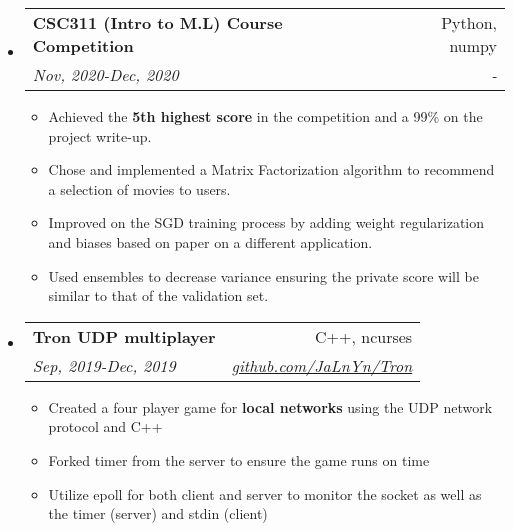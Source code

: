 \documentclass[letterpaper,12pt]{article}[leftmargin=*]
\makeatletter
\def \entryspacing {-0pt}
\newcommand{\resumeEntryStart}{\begin{itemize}[leftmargin=2.5mm]}
\newcommand{\resumeEntryEnd}{\end{itemize}\vspace{\entryspacing}}
\newcommand{\resumeItemListStart}{\begin{itemize}[leftmargin=4.5mm]}
\newcommand{\resumeItemListEnd}{\end{itemize}}
\newcommand{\resumeItem}[1]{
  \item\small{
    {#1 \vspace{-3pt}}
  }
}
\newcommand{\resumeEntryTSDL}[4]{
  \vspace{-1pt}\item[]
    \begin{tabularx}{0.97\textwidth}{X@{\hspace{60pt}}r}
      \textbf{\color{primary}#1} & {\firabook\color{accent}\small#2} \\
      \textit{\color{accent}\small#3} & \textit{\color{accent}\small#4} \\
    \end{tabularx}\vspace{-6pt}
}
\makeatother
\begin{document}
  \resumeEntryStart
    \resumeEntryTSDL
	  {CSC311 (Intro to M.L) Course Competition}{Python, numpy}{Nov, 2020-Dec, 2020}{-}
    \resumeItemListStart
	  \resumeItem {Achieved the \textbf{5th highest score} in the competition and a 99\% on the project write-up.}
      \resumeItem {Chose and implemented a Matrix Factorization algorithm to recommend a selection of movies to users.}
      \resumeItem {Improved on the SGD training process by adding weight regularization and biases based on paper on a different application.}
      \resumeItem {Used ensembles to decrease variance ensuring the private score will be similar to that of the validation set.}
    \resumeItemListEnd
  \resumeEntryEnd 
  \resumeEntryStart
    \resumeEntryTSDL
      {Tron UDP multiplayer}{C++, ncurses}{Sep, 2019-Dec, 2019}{\href{https://github.com/JaLnYn/Tron}{github.com/JaLnYn/Tron}}
    \resumeItemListStart
	\resumeItem {Created a four player game for \textbf{local networks} using the UDP network protocol and C++}
    \resumeItem {Forked timer from the server to ensure the game runs on time}
    \resumeItem {Utilize epoll for both client and server to monitor the socket as well as the timer (server) and stdin (client)}
    \resumeItemListEnd
  \resumeEntryEnd

\end{document}
